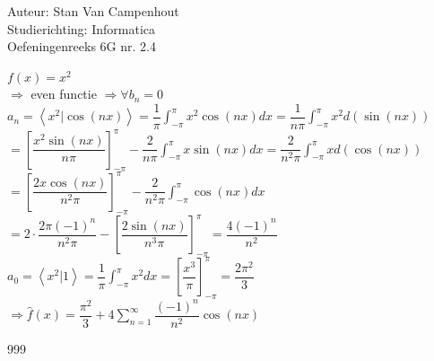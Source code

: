 \documentclass[a4paper]{article}
\begin{document}
  
\noindent \large Auteur: Stan Van Campenhout \\
\noindent \large Studierichting:  Informatica\\
\noindent \large Oefeningenreeks 6G nr. 2.4\\

\medskip

\normalsize

$ f(x) = x^2 $\\

$ \Rightarrow $ even functie  $ \Rightarrow \forall b_n = 0 $\\

$ a_n = \left<x^2|\cos(nx)\right> = \dfrac{1}{\pi}\displaystyle\int_{-\pi}^{\pi}x^2\cos(nx)dx = \dfrac{1}{n\pi}\displaystyle\int_{-\pi}^{\pi}x^2d\left(\sin(nx)\right) $\\

$ = \left[\dfrac{x^2\sin(nx)}{n\pi}\right]_{-\pi}^{\pi} - \dfrac{2}{n\pi}\displaystyle\int_{-\pi}^{\pi}x\sin(nx)dx = \dfrac{2}{n^2\pi}\displaystyle\int_{-\pi}^{\pi}xd\left(\cos(nx)\right) $\\

$ = \left[\dfrac{2x\cos(nx)}{n^2\pi}\right]_{-\pi}^{\pi} - \dfrac{2}{n^2\pi}\displaystyle\int_{-\pi}^{\pi}\cos(nx)dx $\\

$ = 2\cdot\dfrac{2\pi(-1)^n}{n^2\pi} -  \left[\dfrac{2\sin(nx)}{n^3\pi}\right]_{-\pi}^{\pi} = \dfrac{4(-1)^n}{n^2} $\\

$ a_0 = \left<x^2|1\right> = \dfrac{1}{\pi}\displaystyle\int_{-\pi}^{\pi}x^2dx = \left[\dfrac{x^3}{\pi}\right]_{-\pi}^{\pi} = \dfrac{2\pi^2}{3} $\\

$ \Rightarrow \widehat{f}(x) = \dfrac{\pi^2}{3} + 4\displaystyle\sum\limits_{n = 1}^{\infty} \dfrac{(-1)^n}{n^2}\cos(nx) $\\



\begin{thebibliography}{999}
\end{thebibliography}
\end{document}
